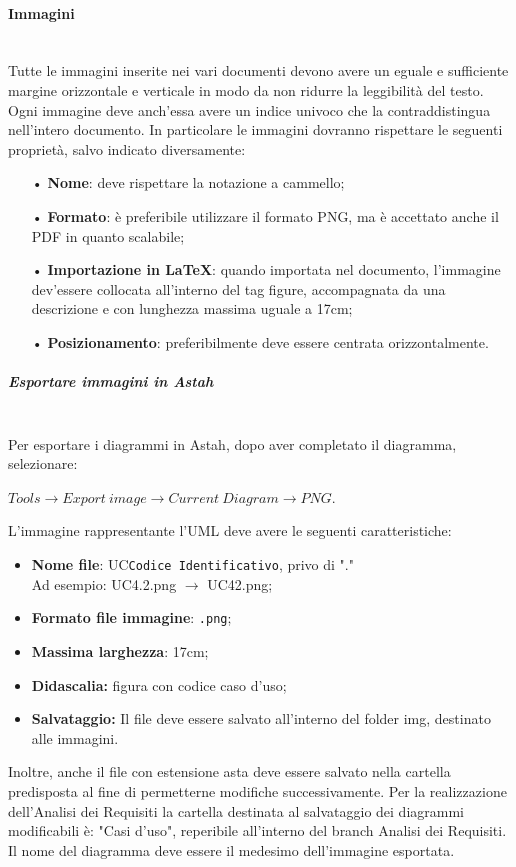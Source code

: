 \paragraph{Immagini}\mbox{}\\
Tutte le immagini inserite nei vari documenti devono avere un eguale e sufficiente margine orizzontale e verticale in modo da non ridurre la leggibilità del testo. Ogni immagine deve anch'essa avere un indice univoco che la contraddistingua nell'intero documento.
In particolare le immagini dovranno rispettare le seguenti proprietà, salvo indicato diversamente:
\begin{itemize}
\item[•] \textbf{Nome}: deve rispettare la {notazione a cammello};
\item[•] \textbf{Formato}: è preferibile utilizzare il formato PNG, ma è accettato anche il PDF in quanto scalabile;
\item[•] \textbf{Importazione in \LaTeX}: quando importata nel documento, l'immagine dev'essere collocata all'interno del tag figure, accompagnata da una descrizione e con lunghezza massima uguale a 17cm;
\item[•] \textbf{Posizionamento}: preferibilmente deve essere centrata orizzontalmente.
\end{itemize}

\subparagraph{Esportare immagini in Astah}\mbox{}\\
Per esportare i diagrammi in Astah, dopo aver completato il diagramma, selezionare: 
\begin{center}
	$Tools \rightarrow Export\ image \rightarrow Current\ Diagram \rightarrow PNG$.
\end{center}

L'immagine rappresentante l'UML deve avere le seguenti caratteristiche:
\begin{itemize}
\item \textbf{Nome file}: UC\texttt{Codice Identificativo}, privo di "."\\
Ad esempio: UC4.2.png $\rightarrow$ UC42.png;
\item \textbf{Formato file immagine}: \texttt{.png};
\item \textbf{Massima larghezza}: 17cm;
\item \textbf{Didascalia:} figura con codice caso d'uso;
\item \textbf{Salvataggio:} Il file deve essere salvato all'interno del folder img, destinato alle immagini.
\end{itemize}
Inoltre, anche il file con estensione asta deve essere salvato nella cartella predisposta al fine di permetterne modifiche successivamente. 
Per la realizzazione dell'Analisi dei Requisiti la cartella destinata al salvataggio dei diagrammi modificabili è: "Casi d'uso", reperibile all'interno del {branch} Analisi dei Requisiti. Il nome del diagramma deve essere il medesimo dell'immagine esportata.

